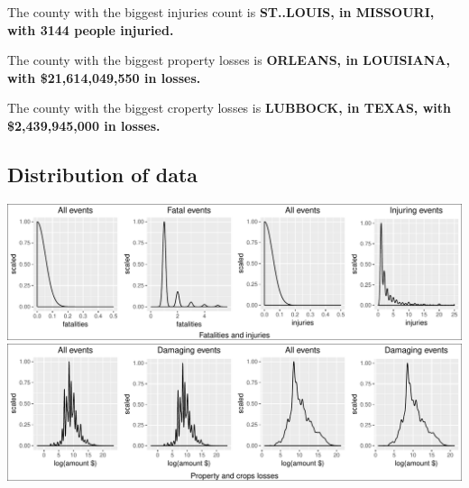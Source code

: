\documentclass[]{article}
\begin{document}
The county with the biggest injuries count is \textbf{ST..LOUIS, in
MISSOURI, with 3144 people injuried.}

The county with the biggest property losses is \textbf{ORLEANS, in
LOUISIANA, with \$21,614,049,550 in losses.}

The county with the biggest croperty losses is \textbf{LUBBOCK, in
TEXAS, with \$2,439,945,000 in losses.}

\subsection{Distribution of data}\label{distribution-of-data}

\includegraphics{readme_files/figure-latex/distribution-1.pdf}
\includegraphics{readme_files/figure-latex/distribution-2.pdf}
\end{document}
